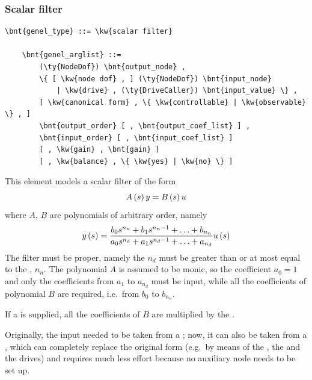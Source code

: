 \subsubsection{Scalar filter}
\label{sec:EL:GENEL:SCALAR-FILTER}
\begin{Verbatim}[commandchars=\\\{\}]
    \bnt{genel_type} ::= \kw{scalar filter}

    \bnt{genel_arglist} ::=
        (\ty{NodeDof}) \bnt{output_node} ,
        \{ [ \kw{node dof} , ] (\ty{NodeDof}) \bnt{input_node}
            | \kw{drive} , (\ty{DriveCaller}) \bnt{input_value} \} ,
        [ \kw{canonical form} , \{ \kw{controllable} | \kw{observable} \} , ]
        \bnt{output_order} [ , \bnt{output_coef_list} ] ,
        \bnt{input_order} [ , \bnt{input_coef_list} ]
        [ , \kw{gain} , \bnt{gain} ]
        [ , \kw{balance} , \{ \kw{yes} | \kw{no} \} ]
\end{Verbatim}
This element models a scalar filter of the form
\begin{displaymath}
    A\left( s \right)y = B\left( s \right)u
\end{displaymath}
where $ A $, $ B $ are polynomials of arbitrary order, namely
\begin{displaymath}
	y\left( s \right) = \frac{
		b_0 s^{n_n}
		+ b_1 s^{n_n-1}
		+ \ldots
		+ b_{n_n}
	}{
		a_0 s^{n_d}
		+ a_1 s^{n_d-1}
		+ \ldots
		+ a_{n_d}
	} u\left( s \right)
\end{displaymath}
The filter must be proper, namely the  $n_d$
must be greater than or at most equal to the , $n_n$.
The polynomial $ A $ is assumed to be monic, so the coefficient 
$a_0=1$ and only the coefficients from $a_1$ to $a_{n_d}$ must be input,
while all the coefficients of polynomial $ B $ are required,
i.e.\ from $b_0$ to $b_{n_n}$.

If a  is supplied, all the coefficients of $ B $
are multiplied by the .

Originally, the input needed to be taken from a ;
now, it can also be taken from a , which can completely replace
the original form (e.g.\ by means of the , the 
and the  drives) and requires much less effort because
no auxiliary node needs to be set up.

